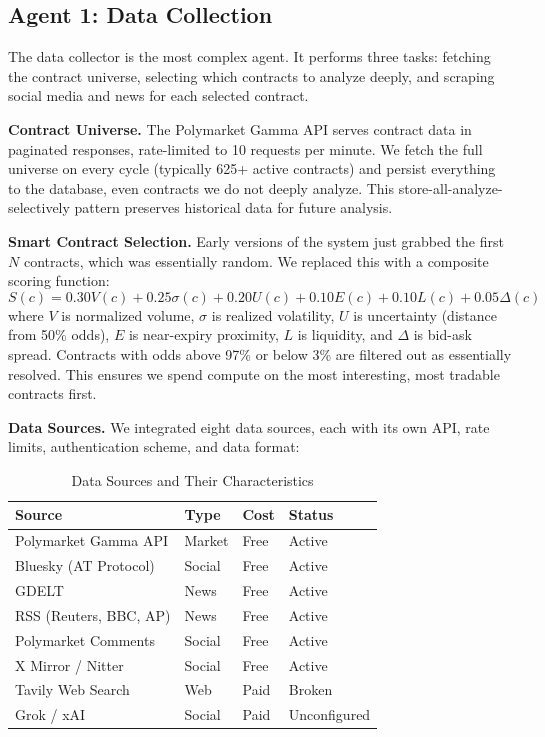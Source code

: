 \documentclass[conference]{IEEEtran}
\begin{document}
\subsection{Agent 1: Data Collection}

The data collector is the most complex agent. It performs three tasks: fetching the contract universe, selecting which contracts to analyze deeply, and scraping social media and news for each selected contract.

\textbf{Contract Universe.} The Polymarket Gamma API serves contract data in paginated responses, rate-limited to 10 requests per minute. We fetch the full universe on every cycle (typically 625+ active contracts) and persist everything to the database, even contracts we do not deeply analyze. This store-all-analyze-selectively pattern preserves historical data for future analysis.

\textbf{Smart Contract Selection.} Early versions of the system just grabbed the first $N$ contracts, which was essentially random. We replaced this with a composite scoring function:
\begin{equation}
S(c) = 0.30 V(c) + 0.25 \sigma(c) + 0.20 U(c) + 0.10 E(c) + 0.10 L(c) + 0.05 \Delta(c)
\end{equation}
where $V$ is normalized volume, $\sigma$ is realized volatility, $U$ is uncertainty (distance from 50\% odds), $E$ is near-expiry proximity, $L$ is liquidity, and $\Delta$ is bid-ask spread. Contracts with odds above 97\% or below 3\% are filtered out as essentially resolved. This ensures we spend compute on the most interesting, most tradable contracts first.

\textbf{Data Sources.} We integrated eight data sources, each with its own API, rate limits, authentication scheme, and data format:

\begin{table}[H]
\centering
\caption{Data Sources and Their Characteristics}
\begin{tabular}{@{}llll@{}}
\toprule
\textbf{Source} & \textbf{Type} & \textbf{Cost} & \textbf{Status} \\
\midrule
Polymarket Gamma API & Market & Free & Active \\
Bluesky (AT Protocol) & Social & Free & Active \\
GDELT & News & Free & Active \\
RSS (Reuters, BBC, AP) & News & Free & Active \\
Polymarket Comments & Social & Free & Active \\
X Mirror / Nitter & Social & Free & Active \\
Tavily Web Search & Web & Paid & Broken \\
Grok / xAI & Social & Paid & Unconfigured \\
\bottomrule
\end{tabular}
\label{tab:sources}
\end{table}
\end{document}
